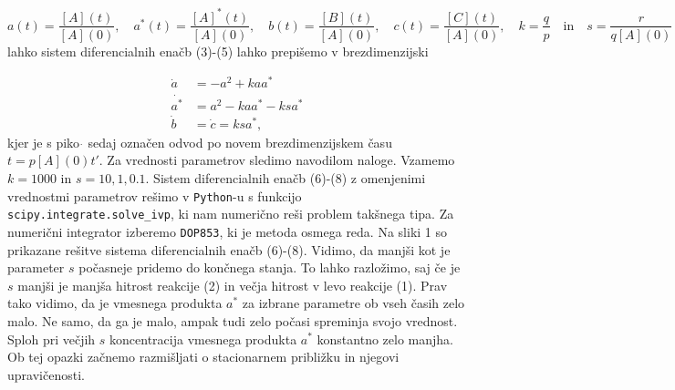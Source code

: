 \documentclass[slovene,11pt,a4paper]{article}
\begin{document}
\[
a(t) = \frac{[A](t)}{[A](0)}, \quad a^*(t) = \frac{[A]^*(t)}{[A](0)}, \quad 
b(t) = \frac{[B](t)}{[A](0)}, \quad c(t) = \frac{[C](t)}{[A](0)}, \quad k = \frac{q}{p} \quad
\text{in} \quad s = \frac{r}{q[A](0)}
\]
lahko sistem diferencialnih enačb (3)-(5) lahko prepišemo v brezdimenzijski

\begin{align}
\dot{a} &= -a^2 + kaa^* \\
\dot{a^*} &= a^2 - kaa^* - ksa^* \\
\dot{b} &= \dot{c} = ksa^*,
\end{align}
kjer je s piko $\dot{}$ sedaj označen odvod po novem brezdimenzijskem času $t = p[A](0)t'$. Za vrednosti parametrov sledimo navodilom naloge. Vzamemo $k = 1000$ in $s = 10, 1, 0.1$. Sistem diferencialnih enačb (6)-(8) z omenjenimi vrednostmi parametrov rešimo v \texttt{Python}-u s funkcijo \texttt{scipy.integrate.solve\_ivp}, ki nam numerično reši problem takšnega tipa. Za numerični integrator izberemo \texttt{DOP853}, ki je metoda osmega reda. Na sliki 1 so prikazane rešitve sistema diferencialnih enačb (6)-(8). Vidimo, da manjši kot je  parameter $s$ počasneje pridemo do končnega stanja. To lahko razložimo, saj če je $s$ manjši je manjša hitrost reakcije (2) in večja hitrost v levo reakcije (1). Prav tako vidimo, da je vmesnega produkta $a^*$ za izbrane parametre ob vseh časih zelo malo. Ne samo, da ga je malo, ampak tudi zelo počasi spreminja svojo vrednost. Sploh pri večjih $s$ koncentracija vmesnega produkta $a^*$ konstantno zelo manjha. Ob tej opazki začnemo razmišljati o stacionarnem približku in njegovi upravičenosti.

\newpage
\end{document}

